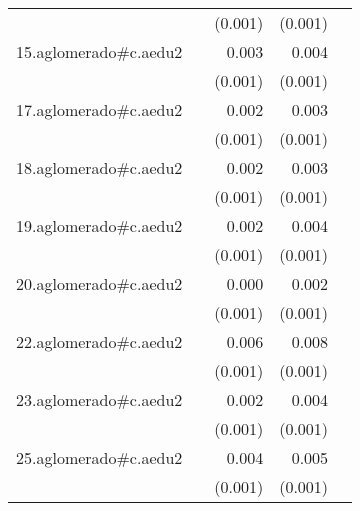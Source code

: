 {\begin{longtable}{l*{4}{D{.}{.}{-1}}}
            &                     &     (0.001)         &     (0.001)         &                     \\
\addlinespace
15.aglomerado#c.aedu2&                     &       0.003\sym{*}  &       0.004\sym{***}&                     \\
            &                     &     (0.001)         &     (0.001)         &                     \\
\addlinespace
17.aglomerado#c.aedu2&                     &       0.002         &       0.003\sym{**} &                     \\
            &                     &     (0.001)         &     (0.001)         &                     \\
\addlinespace
18.aglomerado#c.aedu2&                     &       0.002         &       0.003\sym{***}&                     \\
            &                     &     (0.001)         &     (0.001)         &                     \\
\addlinespace
19.aglomerado#c.aedu2&                     &       0.002         &       0.004\sym{***}&                     \\
            &                     &     (0.001)         &     (0.001)         &                     \\
\addlinespace
20.aglomerado#c.aedu2&                     &       0.000         &       0.002         &                     \\
            &                     &     (0.001)         &     (0.001)         &                     \\
\addlinespace
22.aglomerado#c.aedu2&                     &       0.006\sym{***}&       0.008\sym{***}&                     \\
            &                     &     (0.001)         &     (0.001)         &                     \\
\addlinespace
23.aglomerado#c.aedu2&                     &       0.002         &       0.004\sym{***}&                     \\
            &                     &     (0.001)         &     (0.001)         &                     \\
\addlinespace
25.aglomerado#c.aedu2&                     &       0.004\sym{**} &       0.005\sym{***}&                     \\
            &                     &     (0.001)         &     (0.001)         &                     \\

\end{longtable}}
